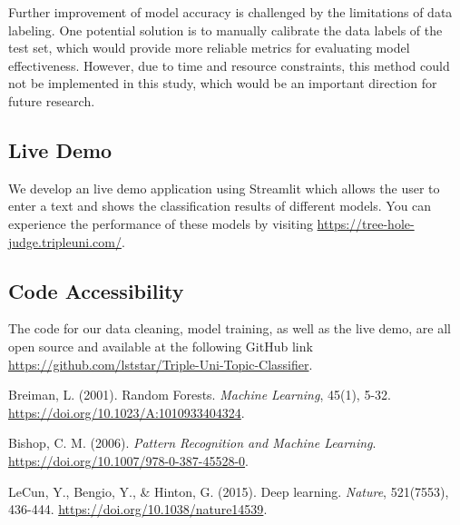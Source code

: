 \documentclass[a4paper, twocolumn]{article}
\begin{document}
Further improvement of model accuracy is challenged by the limitations of data labeling. One potential solution is to manually calibrate the data labels of the test set, which would provide more reliable metrics for evaluating model effectiveness. However, due to time and resource constraints, this method could not be implemented in this study, which would be an important direction for future research.

\subsection{Live Demo}

We develop an live demo application using Streamlit which allows the user to enter a text and shows the classification results of different models. You can experience the performance of these models by visiting \href{https://tree-hole-judge.tripleuni.com/}{https://tree-hole-judge.tripleuni.com/}.

\subsection{Code Accessibility}

The code for our data cleaning, model training, as well as the live demo, are all open source and available at the following GitHub link \href{https://github.com/lststar/Triple-Uni-Topic-Classifier}{https://github.com/lststar/Triple-Uni-Topic-Classifier}.

\newpage

\begin{thebibliography}{3}

Breiman, L. (2001). Random Forests. 
\textit{Machine Learning}, 45(1), 5-32.
\url{https://doi.org/10.1023/A:1010933404324}.

Bishop, C. M. (2006).
\textit{Pattern Recognition and Machine Learning}.
\url{https://doi.org/10.1007/978-0-387-45528-0}.

LeCun, Y., Bengio, Y., \& Hinton, G. (2015). Deep learning.
\textit{Nature}, 521(7553), 436-444.
\url{https://doi.org/10.1038/nature14539}.

\end{thebibliography}
\end{document}
